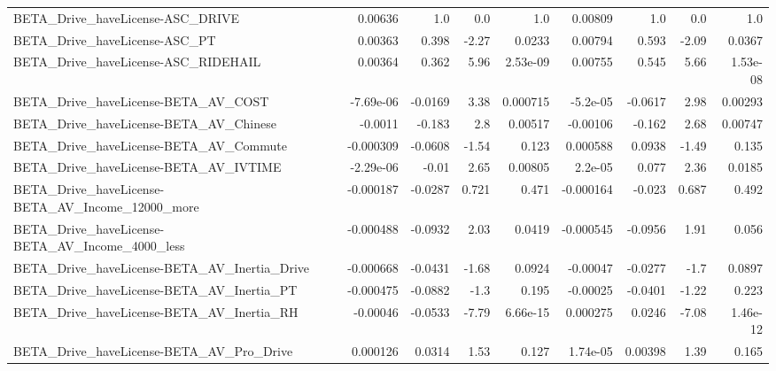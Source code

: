 \begin{tabular}{lrrrrrrrr}
BETA\_Drive\_haveLicense-ASC\_DRIVE                   &     0.00636 &          1.0 &      0.0 &      1.0 &    0.00809 &         1.0 &          0.0 &           1.0 \\
BETA\_Drive\_haveLicense-ASC\_PT                      &     0.00363 &        0.398 &    -2.27 &   0.0233 &    0.00794 &       0.593 &        -2.09 &        0.0367 \\
BETA\_Drive\_haveLicense-ASC\_RIDEHAIL                &     0.00364 &        0.362 &     5.96 & 2.53e-09 &    0.00755 &       0.545 &         5.66 &      1.53e-08 \\
BETA\_Drive\_haveLicense-BETA\_AV\_COST                &   -7.69e-06 &      -0.0169 &     3.38 & 0.000715 &   -5.2e-05 &     -0.0617 &         2.98 &       0.00293 \\
BETA\_Drive\_haveLicense-BETA\_AV\_Chinese             &     -0.0011 &       -0.183 &      2.8 &  0.00517 &   -0.00106 &      -0.162 &         2.68 &       0.00747 \\
BETA\_Drive\_haveLicense-BETA\_AV\_Commute             &   -0.000309 &      -0.0608 &    -1.54 &    0.123 &   0.000588 &      0.0938 &        -1.49 &         0.135 \\
BETA\_Drive\_haveLicense-BETA\_AV\_IVTIME              &   -2.29e-06 &        -0.01 &     2.65 &  0.00805 &    2.2e-05 &       0.077 &         2.36 &        0.0185 \\
BETA\_Drive\_haveLicense-BETA\_AV\_Income\_12000\_more   &   -0.000187 &      -0.0287 &    0.721 &    0.471 &  -0.000164 &      -0.023 &        0.687 &         0.492 \\
BETA\_Drive\_haveLicense-BETA\_AV\_Income\_4000\_less    &   -0.000488 &      -0.0932 &     2.03 &   0.0419 &  -0.000545 &     -0.0956 &         1.91 &         0.056 \\
BETA\_Drive\_haveLicense-BETA\_AV\_Inertia\_Drive       &   -0.000668 &      -0.0431 &    -1.68 &   0.0924 &   -0.00047 &     -0.0277 &         -1.7 &        0.0897 \\
BETA\_Drive\_haveLicense-BETA\_AV\_Inertia\_PT          &   -0.000475 &      -0.0882 &     -1.3 &    0.195 &   -0.00025 &     -0.0401 &        -1.22 &         0.223 \\
BETA\_Drive\_haveLicense-BETA\_AV\_Inertia\_RH          &    -0.00046 &      -0.0533 &    -7.79 & 6.66e-15 &   0.000275 &      0.0246 &        -7.08 &      1.46e-12 \\
BETA\_Drive\_haveLicense-BETA\_AV\_Pro\_Drive           &    0.000126 &       0.0314 &     1.53 &    0.127 &   1.74e-05 &     0.00398 &         1.39 &         0.165 \\

\end{tabular}
